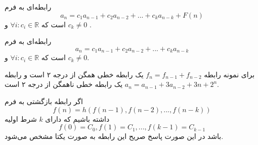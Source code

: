 \begin{DEFINITION}
    \p
    رابطه‌ای به فرم
   \[a_n=c_{1}a_{n-1}+c_{2}a_{n-2}+...+c_{k}a_{n-k}+F(n)\]
   است که
   $\forall{i}:c_i \in \mathbb{R} $
   و 
   $ c_k\neq 0$
.
\end{DEFINITION}

 \begin{DEFINITION}
    \p
    رابطه‌ای به فرم
   \[a_n=c_{1}a_{n-1}+c_{2}a_{n-2}+...+c_{k}a_{n-k}\]
   است که
   $\forall{i}:c_i \in \mathbb{R} $
   و 
   $ c_k\neq 0$.


\end{DEFINITION}

\p
برای نمونه رابطه‌ 
$f_n=f_{n-1}+f_{n-2}$
یک رابطه‌ خطی همگن از درجه ۲ است و رابطه‌ 
$a_n=a_{n-1}+3a_{n-2}+3n+2^n$
یک رابطه‌ خطی ناهمگن از درجه ۲ است.

\begin{THEOREM}
    \p
    اگر رابطه بازگشتی به فرم
    \[f(n)=h(f(n-1),f(n-2),...,f(n-k))\]
    داشته باشیم که دارای 
    $k$
    شرط اولیه
    $$f(0)=C_0, f(1)=C_1, ..., f(k-1)=C_{k-1}$$
    باشد
    در این صورت پاسخ صریح این رابطه به صورت یکتا مشخص می‌شود.
\end{THEOREM}
